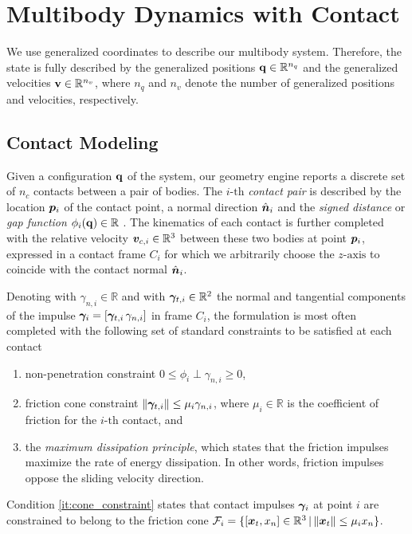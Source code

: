 \section{Multibody Dynamics with Contact}
\label{sec:multibody_dynamics_with_contact}

We use generalized coordinates to describe our multibody system. Therefore, the
state is fully described by the generalized positions
${\mathbf{q}}\in\mathbb{R}^{n_q}$ and the generalized velocities
${\mathbf{v}}\in\mathbb{R}^{n_v}$, where $n_q$ and $n_v$ denote the number of
generalized positions and velocities, respectively.

\subsection{Contact Modeling}

Given a configuration ${\mathbf{q}}$ of the system, our geometry engine reports a
discrete set of $n_c$ contacts between a pair of bodies. The $i\text{-th}$
\emph{contact pair} is described by the location ${\bm{p}}_i$ of the contact
point, a normal direction $\hat{{\bm{n}}}_i$ and the \emph{signed distance} or
\emph{gap function} $\phi_i({\mathbf{q}})\in\mathbb{R}$ . The kinematics of each contact is further
completed with the relative velocity ${\bm{v}}_{c,i}\in\mathbb{R}^3$ between these
two bodies at point ${\bm{p}}_i$, expressed in a contact frame $C_i$ for which we
arbitrarily choose the $z\text{-axis}$ to coincide with the contact normal
$\hat{{\bm{n}}}_i$.

Denoting with $\gamma_{n,i} \in \mathbb{R}$ and with ${\bm\gamma}_{t,i} \in
\mathbb{R}^2$ the normal and tangential components of the impulse
${\bm\gamma}_i=[{\bm\gamma}_{t,i}\,\gamma_{n,i}]$ in frame $C_i$, the formulation is
most often completed with the following set of standard constraints to be
satisfied at each contact
\begin{enumerate}
	\item non-penetration constraint $0\le\phi_i\perp\gamma_{n,i}\ge0$,
	\item\label{it:cone_constraint} friction cone constraint
	$\Vert{\bm\gamma}_{t,i}\Vert\le \mu_i\gamma_{n,i}$, where $\mu_i \in \mathbb{R}$
	is the coefficient of friction for the $i\text{-th}$ contact, and
	\item the \emph{maximum dissipation principle}, which states that the
	friction impulses maximize the rate of energy dissipation. In other words,
	friction impulses oppose the sliding velocity direction.
\end{enumerate}
Condition \ref{it:cone_constraint} states that contact impulses ${\bm\gamma}_i$ at
point $i$ are constrained to belong to the friction cone
$\mathcal{F}_i=\{[{\bm{x}}_t, x_n] \in\mathbb{R}^3 \,|\, \Vert{\bm{x}}_t\Vert\le
\mu_i x_n\}$. 

